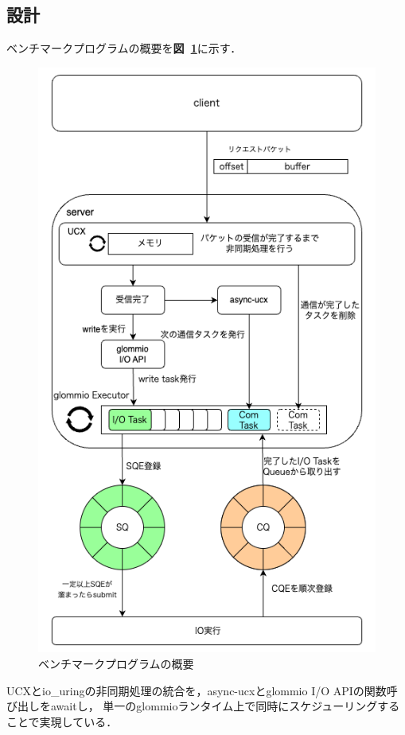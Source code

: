 \documentclass[a4paper,11pt]{jreport}
\newcommand\figref[1]{\textbf{図~\ref{fig:#1}}}
\begin{document}
\subsection{設計}\label{sec:io_rpc_benchprog}
ベンチマークプログラムの概要を\figref{benchmark}に示す．
\begin{figure}[tb]
	\centering
	\includegraphics[width=13cm, bb=0 0 520 710]{figures/rpc_overview.png}
	\caption{ベンチマークプログラムの概要}
	\label{fig:benchmark}
\end{figure}

UCXとio\_uringの非同期処理の統合を，async-ucxとglommio I/O APIの関数呼び出しをawaitし，
単一のglommioランタイム上で同時にスケジューリングすることで実現している．
\end{document}
